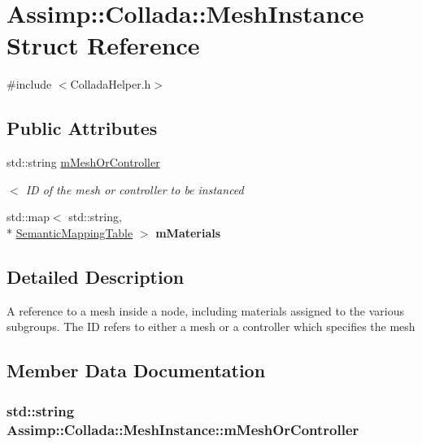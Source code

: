 \hypertarget{struct_assimp_1_1_collada_1_1_mesh_instance}{\section{Assimp\+:\+:Collada\+:\+:Mesh\+Instance Struct Reference}
\label{struct_assimp_1_1_collada_1_1_mesh_instance}
}


{\ttfamily \#include $<$Collada\+Helper.\+h$>$}

\subsection*{Public Attributes}
\begin{DoxyCompactItemize}
\item 
std\+::string \hyperlink{struct_assimp_1_1_collada_1_1_mesh_instance_a09aa8b955f8e5a8fc0be48c1c9c0fe84}{m\+Mesh\+Or\+Controller}
\begin{DoxyCompactList}\small\item\em $<$ I\+D of the mesh or controller to be instanced \end{DoxyCompactList}\item 
\hypertarget{struct_assimp_1_1_collada_1_1_mesh_instance_a9dc161934adff4284e759d6d5c33d0f4}{std\+::map$<$ std\+::string, \\*
\hyperlink{struct_assimp_1_1_collada_1_1_semantic_mapping_table}{Semantic\+Mapping\+Table} $>$ {\bfseries m\+Materials}}\label{struct_assimp_1_1_collada_1_1_mesh_instance_a9dc161934adff4284e759d6d5c33d0f4}

\end{DoxyCompactItemize}


\subsection{Detailed Description}
A reference to a mesh inside a node, including materials assigned to the various subgroups. The I\+D refers to either a mesh or a controller which specifies the mesh 

\subsection{Member Data Documentation}
\hypertarget{struct_assimp_1_1_collada_1_1_mesh_instance_a09aa8b955f8e5a8fc0be48c1c9c0fe84}{
\subsubsection[{m\+Mesh\+Or\+Controller}]{\setlength{\rightskip}{0pt plus 5cm}std\+::string Assimp\+::\+Collada\+::\+Mesh\+Instance\+::m\+Mesh\+Or\+Controller}}\label{struct_assimp_1_1_collada_1_1_mesh_instance_a09aa8b955f8e5a8fc0be48c1c9c0fe84}


